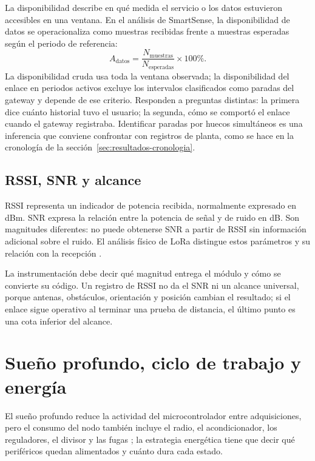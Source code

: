 La disponibilidad describe en qué medida el servicio o los datos estuvieron accesibles en una ventana. En el análisis de SmartSense, la disponibilidad de datos se operacionaliza como muestras recibidas frente a muestras esperadas según el periodo de referencia:
\begin{equation}
A_{\mathrm{datos}}=\frac{N_{\mathrm{muestras}}}{N_{\mathrm{esperadas}}}\times100\text{\%}.
\label{eq:marco-disponibilidad}
\end{equation}
La disponibilidad cruda usa toda la ventana observada; la disponibilidad del enlace en periodos activos excluye los intervalos clasificados como paradas del gateway y depende de ese criterio. Responden a preguntas distintas: la primera dice cuánto historial tuvo el usuario; la segunda, cómo se comportó el enlace cuando el gateway registraba. Identificar paradas por huecos simultáneos es una inferencia que conviene confrontar con registros de planta, como se hace en la cronología de la sección~\ref{sec:resultados-cronologia}.

\subsection{RSSI, SNR y alcance}
RSSI representa un indicador de potencia recibida, normalmente expresado en dBm. SNR expresa la relación entre la potencia de señal y de ruido en dB. Son magnitudes diferentes: no puede obtenerse SNR a partir de RSSI sin información adicional sobre el ruido. El análisis físico de LoRa distingue estos parámetros y su relación con la recepción \citep{augustin2016}.

La instrumentación debe decir qué magnitud entrega el módulo y cómo se convierte su código. Un registro de RSSI no da el SNR ni un alcance universal, porque antenas, obstáculos, orientación y posición cambian el resultado; si el enlace sigue operativo al terminar una prueba de distancia, el último punto es una cota inferior del alcance.

\section{Sueño profundo, ciclo de trabajo y energía}
\label{sec:marco-energia}
El sueño profundo reduce la actividad del microcontrolador entre adquisiciones, pero el consumo del nodo también incluye el radio, el acondicionador, los reguladores, el divisor y las fugas \citep{xiaoc6}; la estrategia energética tiene que decir qué periféricos quedan alimentados y cuánto dura cada estado.

